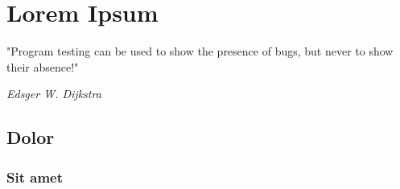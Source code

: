 \chapter{Lorem Ipsum}\label{chap:lipsum}

\epigraph{"Program testing can be used to show the presence of bugs, but never to show their absence!"}{\textit{Edsger W. Dijkstra}}

\lipsum[1]

\section{Dolor}
\lipsum[2-4]

\subsection{Sit amet}
\lipsum[5-12]